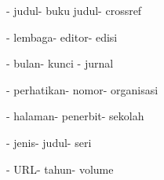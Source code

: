 \begin{itemize}
\begin{itemize}
\hspace*{0.3in}- judul\hspace*{0.4in}\hspace*{0.3in}- buku judul\hspace*{0.3in}\hspace*{0.1in}- crossref\par

\hspace*{0.3in}- lembaga\hspace*{0.3in}\hspace*{0.3in}- editor\hspace*{0.3in}\hspace*{0.3in}- edisi\par

\hspace*{0.3in}- bulan\hspace*{0.4in}\hspace*{0.3in}- kunci \hspace*{0.3in}\hspace*{0.3in}- jurnal\par

\hspace*{0.3in}- perhatikan\hspace*{0.1in}\hspace*{0.3in}- nomor\hspace*{0.3in}\hspace*{0.3in}- organisasi\par

\hspace*{0.3in}- halaman\hspace*{0.3in}\hspace*{0.2in}- penerbit\hspace*{0.3in}\hspace*{0.2in}- sekolah\par

\hspace*{0.3in}- jenis\hspace*{0.3in}\hspace*{0.4in}- judul\hspace*{0.3in}\hspace*{0.4in}- seri\par

\hspace*{0.3in}- URL\hspace*{0.4in}\hspace*{0.3in}- tahun\hspace*{0.3in}\hspace*{0.4in}- volume\par


\end{itemize}
\end{itemize}
